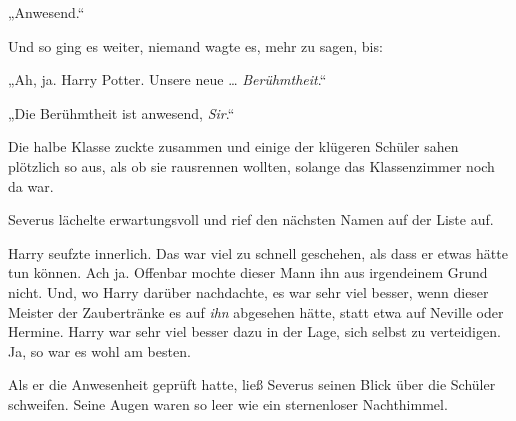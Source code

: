 „Anwesend.“

Und so ging es weiter, niemand wagte es, mehr zu sagen, bis:

„Ah, ja. Harry Potter. Unsere neue … \emph{Berühmtheit}.“

„Die Berühmtheit ist anwesend, \emph{Sir}.“

Die halbe Klasse zuckte zusammen und einige der klügeren Schüler sahen plötzlich so aus, als ob sie rausrennen wollten, solange das Klassenzimmer noch da war.

Severus lächelte erwartungsvoll und rief den nächsten Namen auf der Liste auf.

Harry seufzte innerlich. Das war viel zu schnell geschehen, als dass er etwas hätte tun können. Ach ja. Offenbar mochte dieser Mann ihn aus irgendeinem Grund nicht. Und, wo Harry darüber nachdachte, es war sehr viel besser, wenn dieser Meister der Zaubertränke es auf \emph{ihn} abgesehen hätte, statt etwa auf Neville oder Hermine. Harry war sehr viel besser dazu in der Lage, sich selbst zu verteidigen. Ja, so war es wohl am besten.

Als er die Anwesenheit geprüft hatte, ließ Severus seinen Blick über die Schüler schweifen. Seine Augen waren so leer wie ein sternenloser Nachthimmel.

